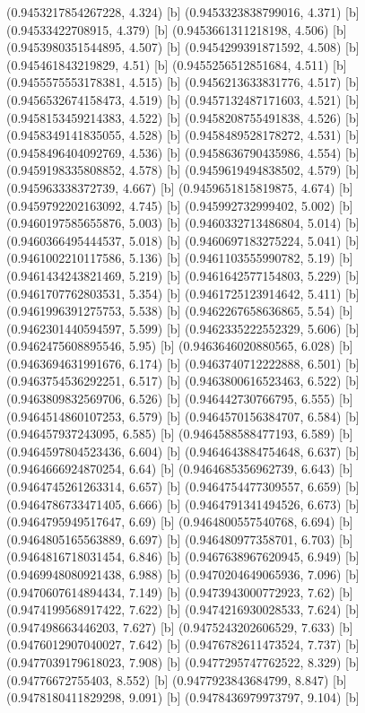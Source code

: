 {{{(0.9453217854267228, 4.324) [b] 
(0.9453323838799016, 4.371) [b] 
(0.94533422708915, 4.379) [b] 
(0.9453661311218198, 4.506) [b] 
(0.9453980351544895, 4.507) [b] 
(0.9454299391871592, 4.508) [b] 
(0.945461843219829, 4.51) [b] 
(0.9455256512851684, 4.511) [b] 
(0.9455575553178381, 4.515) [b] 
(0.9456213633831776, 4.517) [b] 
(0.9456532674158473, 4.519) [b] 
(0.9457132487171603, 4.521) [b] 
(0.9458153459214383, 4.522) [b] 
(0.9458208755491838, 4.526) [b] 
(0.9458349141835055, 4.528) [b] 
(0.9458489528178272, 4.531) [b] 
(0.9458496404092769, 4.536) [b] 
(0.9458636790435986, 4.554) [b] 
(0.9459198335808852, 4.578) [b] 
(0.9459619494838502, 4.579) [b] 
(0.945963338372739, 4.667) [b] 
(0.9459651815819875, 4.674) [b] 
(0.9459792202163092, 4.745) [b] 
(0.945992732999402, 5.002) [b] 
(0.9460197585655876, 5.003) [b] 
(0.9460332713486804, 5.014) [b] 
(0.9460366495444537, 5.018) [b] 
(0.9460697183275224, 5.041) [b] 
(0.9461002210117586, 5.136) [b] 
(0.9461103555990782, 5.19) [b] 
(0.9461434243821469, 5.219) [b] 
(0.9461642577154803, 5.229) [b] 
(0.9461707762803531, 5.354) [b] 
(0.9461725123914642, 5.411) [b] 
(0.9461996391275753, 5.538) [b] 
(0.9462267658636865, 5.54) [b] 
(0.9462301440594597, 5.599) [b] 
(0.9462335222552329, 5.606) [b] 
(0.9462475608895546, 5.95) [b] 
(0.9463646020880565, 6.028) [b] 
(0.9463694631991676, 6.174) [b] 
(0.9463740712222888, 6.501) [b] 
(0.9463754536292251, 6.517) [b] 
(0.9463800616523463, 6.522) [b] 
(0.9463809832569706, 6.526) [b] 
(0.946442730766795, 6.555) [b] 
(0.9464514860107253, 6.579) [b] 
(0.9464570156384707, 6.584) [b] 
(0.946457937243095, 6.585) [b] 
(0.9464588588477193, 6.589) [b] 
(0.9464597804523436, 6.604) [b] 
(0.9464643884754648, 6.637) [b] 
(0.9464666924870254, 6.64) [b] 
(0.9464685356962739, 6.643) [b] 
(0.9464745261263314, 6.657) [b] 
(0.9464754477309557, 6.659) [b] 
(0.9464786733471405, 6.666) [b] 
(0.9464791341494526, 6.673) [b] 
(0.9464795949517647, 6.69) [b] 
(0.9464800557540768, 6.694) [b] 
(0.9464805165563889, 6.697) [b] 
(0.946480977358701, 6.703) [b] 
(0.9464816718031454, 6.846) [b] 
(0.9467638967620945, 6.949) [b] 
(0.9469948080921438, 6.988) [b] 
(0.9470204649065936, 7.096) [b] 
(0.9470607614894434, 7.149) [b] 
(0.9473943000772923, 7.62) [b] 
(0.9474199568917422, 7.622) [b] 
(0.9474216930028533, 7.624) [b] 
(0.947498663446203, 7.627) [b] 
(0.9475243202606529, 7.633) [b] 
(0.9476012907040027, 7.642) [b] 
(0.9476782611473524, 7.737) [b] 
(0.9477039179618023, 7.908) [b] 
(0.9477295747762522, 8.329) [b] 
(0.94776672755403, 8.552) [b] 
(0.9477923843684799, 8.847) [b] 
(0.9478180411829298, 9.091) [b] 
(0.9478436979973797, 9.104) [b] 
}}}
